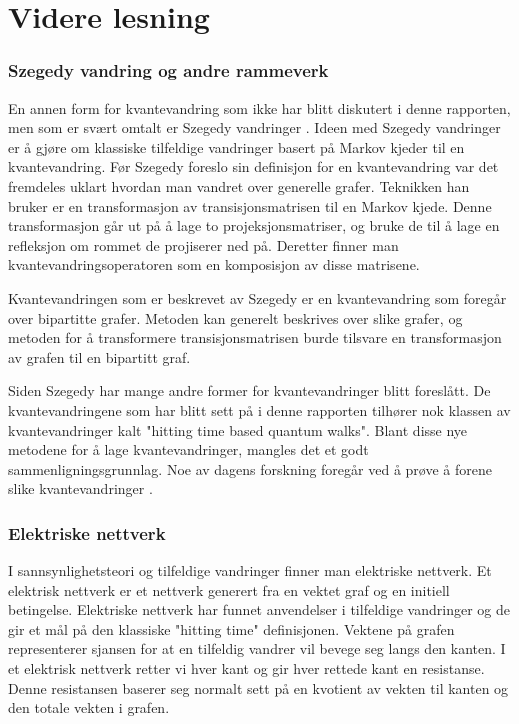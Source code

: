 \section{Videre lesning}

    \subsubsection*{Szegedy vandring og andre rammeverk}
    
        En annen form for kvantevandring som ikke har blitt diskutert i denne rapporten, men som er svært omtalt er Szegedy vandringer \cite{dewolf2021quantum}\cite{Venegas_Andraca_2012}\cite{portugal_2019}. Ideen med Szegedy vandringer er å gjøre om klassiske tilfeldige vandringer basert på Markov kjeder til en kvantevandring. Før Szegedy foreslo sin definisjon for en kvantevandring var det fremdeles uklart hvordan man vandret over generelle grafer. Teknikken han bruker er en transformasjon av transisjonsmatrisen til en Markov kjede. Denne transformasjon går ut på å lage to projeksjonsmatriser, og bruke de til å lage en refleksjon om rommet de projiserer ned på. Deretter finner man kvantevandringsoperatoren som en komposisjon av disse matrisene. 
        
        Kvantevandringen som er beskrevet av Szegedy er en kvantevandring som foregår over bipartitte grafer. Metoden kan generelt beskrives over slike grafer, og metoden for å transformere transisjonsmatrisen burde tilsvare en transformasjon av grafen til en bipartitt graf.
        
        Siden Szegedy har mange andre former for kvantevandringer blitt foreslått. De kvantevandringene som har blitt sett på i denne rapporten tilhører nok klassen av kvantevandringer kalt "hitting time based quantum walks". Blant disse nye metodene for å lage kvantevandringer, mangles det et godt sammenligningsgrunnlag. Noe av dagens forskning foregår ved å prøve å forene slike kvantevandringer \cite{apers2019unified}.

    \subsubsection*{Elektriske nettverk}
    
        I sannsynlighetsteori og tilfeldige vandringer finner man elektriske nettverk. Et elektrisk nettverk er et nettverk generert fra en vektet graf og en initiell betingelse. Elektriske nettverk har funnet anvendelser i tilfeldige vandringer og de gir et mål på den klassiske "hitting time" definisjonen. Vektene på grafen representerer sjansen for at en tilfeldig vandrer vil bevege seg langs den kanten. I et elektrisk nettverk retter vi hver kant og gir hver rettede kant en resistanse. Denne resistansen baserer seg normalt sett på en kvotient av vekten til kanten og den totale vekten i grafen.
        
